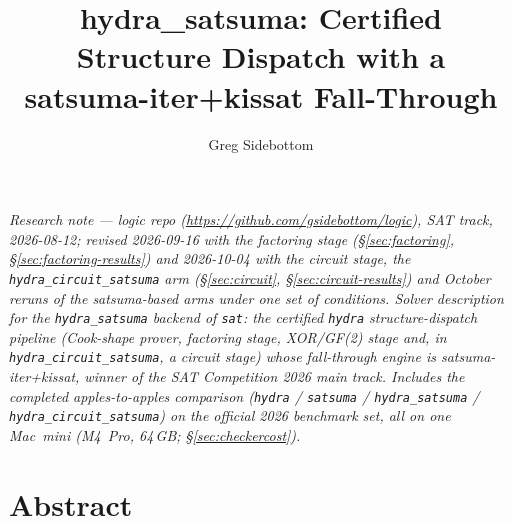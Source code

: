 \documentclass[10pt]{article}
\title{\bfseries hydra\_satsuma: Certified Structure Dispatch with a\\
  satsuma-iter+kissat Fall-Through}
\author{Greg Sidebottom}
\date{}
\begin{document}
\maketitle
\vspace{-3em}
\begin{center}
\itshape Research note --- logic repo
(\url{https://github.com/gsidebottom/logic}), SAT track, 2026-08-12;
revised 2026-09-16 with the factoring stage
(\S\ref{sec:factoring}, \S\ref{sec:factoring-results}) and 2026-10-04
with the circuit stage, the \texttt{hydra\_circuit\_satsuma} arm
(\S\ref{sec:circuit}, \S\ref{sec:circuit-results}) and October reruns
of the satsuma-based arms under one set of conditions.
Solver description for the \texttt{hydra\_satsuma} backend of
\texttt{sat}: the certified \texttt{hydra} structure-dispatch pipeline
(Cook-shape prover, factoring stage, XOR/GF(2) stage and, in
\texttt{hydra\_circuit\_satsuma}, a circuit stage) whose fall-through
engine is satsuma-iter+kissat, winner of the SAT Competition 2026 main
track.
Includes the completed apples-to-apples comparison
(\texttt{hydra} / \texttt{satsuma} / \texttt{hydra\_satsuma} /
\texttt{hydra\_circuit\_satsuma}) on the
official 2026 benchmark set, all on one Mac~mini (M4~Pro,
64\,GB; \S\ref{sec:checkercost}).
\end{center}

\section*{Abstract}
\end{document}
